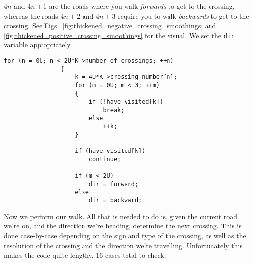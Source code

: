 \documentclass{article}
\theoremstyle{plain}
\begin{document}
        $4n$ and $4n+1$ are the roads where you walk \textit{forwards} to
        get to the crossing, whereas the roads $4n+2$ and $4n+3$ require you to
        walk \textit{backwards} to get to the crossing.
        See Figs.~\ref{fig:thickened_negative_crossing_smoothings} and
        \ref{fig:thickened_positive_crossing_smoothings} for the visual.
        We set the \texttt{dir} variable appropriately.
        \begin{lstlisting}[style=CStyle, gobble=12]
                for (n = 0U; n < 2U*K->number_of_crossings; ++n)
                {
                    k = 4U*K->crossing_number[n];
                    for (m = 0U; m < 3; ++m)
                    {
                        if (!have_visited[k])
                            break;
                        else
                            ++k;
                    }

                    if (have_visited[k])
                        continue;

                    if (m < 2U)
                        dir = forward;
                    else
                        dir = backward;
        \end{lstlisting}
        Now we perform our walk. All that is needed to do is, given the
        current road we're on, and the direction we're heading, determine the
        next crossing. This is done case-by-case depending on the sign and
        type of the crossing, as well as the resolution of the crossing and the
        direction we're travelling. Unfortunately this makes the code quite
        lengthy, 16 cases total to check.
\end{document}
